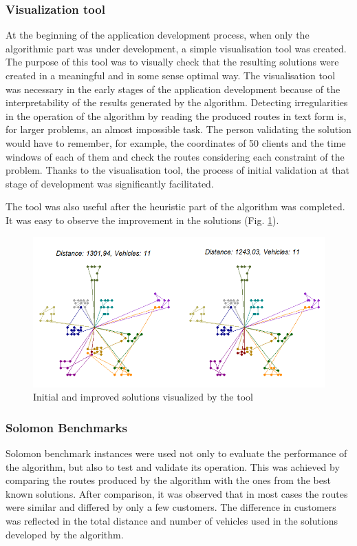 \documentclass[a4paper,twoside,12pt]{book}
\begin{document}
\subsubsection{Visualization tool}
At the beginning of the application development process, when only the algorithmic part was under development, a simple visualisation tool was created. The purpose of this tool was to visually check that the resulting solutions were created in a meaningful and in some sense optimal way. The visualisation tool was necessary in the early stages of the application development because of the interpretability of the results generated by the algorithm. Detecting irregularities in the operation of the algorithm by reading the produced routes in text form is, for larger problems, an almost impossible task. The person validating the solution would have to remember, for example, the coordinates of 50 clients and the time windows of each of them and check the routes considering each constraint of the problem. Thanks to the visualisation tool, the process of initial validation at that stage of development was significantly facilitated.

The tool was also useful after the heuristic part of the algorithm was completed. It was easy to observe the improvement in the solutions (Fig. \ref{fig:visualizationTestExample}).

\begin{figure}[H]
\centering
\includegraphics[width=\textwidth]{images/visualizationTestExample.png}
\caption{Initial and improved solutions visualized by the tool}
\label{fig:visualizationTestExample}
\end{figure}

\subsubsection{Solomon Benchmarks}
Solomon benchmark instances were used not only to evaluate the performance of the algorithm, but also to test and validate its operation. This was achieved by comparing the routes produced by the algorithm with the ones from the best known solutions. After comparison, it was observed that in most cases the routes were similar and differed by only a few customers. The difference in customers was reflected in the total distance and number of vehicles used in the solutions developed by the algorithm.
\end{document}
